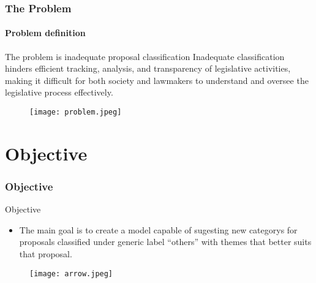 \begin{frame}
	\frametitle{The Problem}
	\framesubtitle{Problem definition}	

	\begin{alertblock}{The problem is inadequate proposal classification}
		Inadequate classification hinders efficient tracking, analysis, and transparency of legislative activities, making it difficult for both society and lawmakers to understand and oversee the legislative process effectively.
	\end{alertblock}	

	\begin{figure}
		\texttt{[image: problem.jpeg]}
	\end{figure}


	
	

\end{frame}
\section{Objective}
\begin{frame}
	\frametitle{Objective}
	
	\begin{block}{Objective} 
	\begin{itemize}
		\item The main goal is to create a model capable of sugesting new categorys for proposals classified under generic label ``others'' with themes that better suits that proposal.
	\end{itemize}
	\end{block}
		
	\begin{figure}
		\texttt{[image: arrow.jpeg]}
	\end{figure}
		
	
\end{frame}
